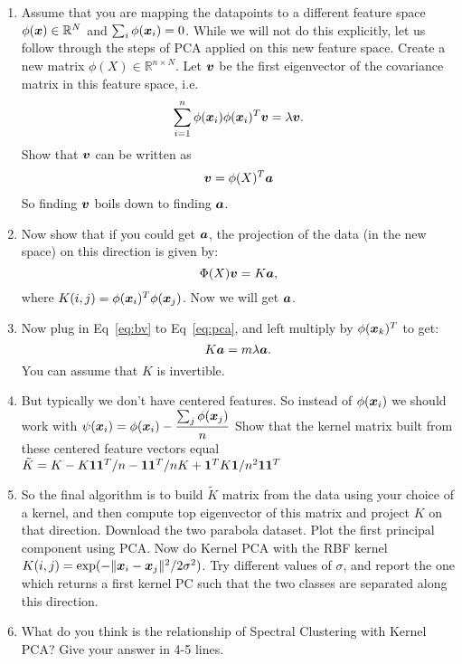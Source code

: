 \documentclass[11pt]{article}
\begin{document}
\begin{enumerate}
\begin{enumerate}
\item Assume that you are mapping the datapoints to a different feature space $\phi(\boldsymbol{x})\in \mathbb{R}^N$ and $\sum_i \phi(\boldsymbol{x}_i)=0$.
While we will not do this explicitly, let us follow through the steps of PCA applied on this new feature space. Create a new matrix $\phi(X)\in\mathbb{R}^{n\times N}$. Let $\boldsymbol{v}$ be the first eigenvector of the covariance matrix in this feature space, i.e.
\begin{align}
\label{eq:pca}
\sum_{i=1}^n\phi(\boldsymbol{x}_i)\phi(\boldsymbol{x}_i)^T\boldsymbol{v}=\lambda \boldsymbol{v}.
\end{align}
 Show that $\boldsymbol{v}$ can be written as 
\begin{align}\label{eq:bv}
\boldsymbol{v}=\phi(X)^T\boldsymbol{a}
\end{align}
So finding $\boldsymbol{v}$ boils down to finding $\boldsymbol{a}$. 
\item Now show that if you could get $\boldsymbol{a}$, the projection of the data (in the new space) on this direction is given by:
$$\Phi(X)\boldsymbol{v}=K\boldsymbol{a},$$
where $K(i,j)=\phi(\boldsymbol{x}_i)^T\phi(\boldsymbol{x}_j)$. Now we will get $\boldsymbol{a}$.
\item Now plug in Eq~\eqref{eq:bv} to Eq~\eqref{eq:pca}, and left multiply by $\phi(\boldsymbol{x}_k)^T$ to get:
$$K\boldsymbol{a}=m\lambda \boldsymbol{a}.$$
You can assume that $K$ is invertible.
\item But typically we don't have centered features. So instead of $\phi(\boldsymbol{x}_i)$ we should work with $\psi(\boldsymbol{x}_i)=\phi(\boldsymbol{x}_i)-\dfrac{\sum_j \phi(\boldsymbol{x}_j)}{n}$
Show that the kernel matrix built from these centered feature vectors equal $\tilde{K}=K-K\boldsymbol{1}\boldsymbol{1}^T/n-\boldsymbol{1}\boldsymbol{1}^T/nK+\boldsymbol{1}^TK\boldsymbol{1}/n^2\boldsymbol{1}\boldsymbol{1}^T$
\item So the final algorithm is to build $\tilde{K}$ matrix from the data using your choice of a kernel, and then compute top eigenvector of this matrix and project $K$ on that direction. Download the two parabola dataset. Plot the first principal component using PCA. Now do Kernel PCA with the RBF kernel $K(i,j)=\exp(-\|\boldsymbol{x}_i-\boldsymbol{x}_j\|^2/2\sigma^2)$. Try different values of $\sigma$, and report the one which returns a first kernel PC such that the two classes are separated along this direction.
\item What do you think is the relationship of Spectral Clustering with Kernel PCA? Give your answer in 4-5 lines.
\end{enumerate}
\end{enumerate}
\end{document}
